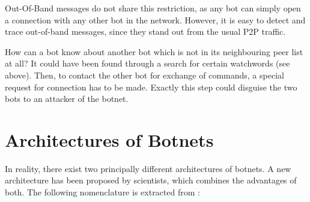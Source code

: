 \documentclass{llncs}
\begin{document}
\begin{itemize}
Out-Of-Band messages do not share this restriction, as any bot can
simply open a connection with any other bot in the network. However,
it is easy to detect and trace out-of-band messages, since they stand
out from the usual P2P traffic. 

How can a bot know about another bot which is not in its neighbouring
peer list at all? It could have been found through a search for
certain watchwords (see above). Then, to contact the other bot for
exchange of commands, a special request for connection has to be
made. Exactly this step could disguise the two bots to an attacker of
the botnet.
\end{itemize}


\section{Architectures of Botnets}
\label{architecture}
In reality, there exist two principally different architectures of
botnets. A new architecture has been proposed by scientists, which
combines the advantages of both. The following nomenclature is
extracted from \cite{steggink2007detection}:
\end{document}
